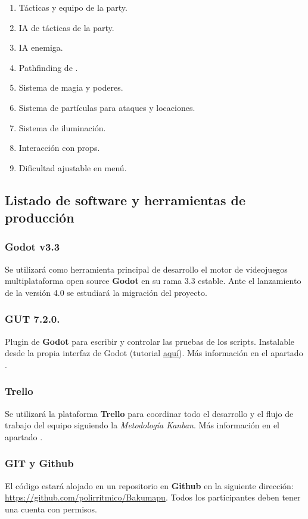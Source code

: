 \begin{enumerate}
\begin{enumerate}[noitemsep]
	\end{enumerate}
	\item Tácticas y equipo de la party.
	\item IA de tácticas de la party.
	\item IA enemiga.
	\item Pathfinding de .
	\item Sistema de magia y poderes.
	\item Sistema de partículas para ataques y locaciones.
	\item Sistema de iluminación.
	\item Interacción con props.
	\item Dificultad ajustable en menú.
\end{enumerate}

\subsection{Listado de software y herramientas de producción}\label{intro:software-y-herramientas}

\subsubsection{Godot v3.3}
Se utilizará como herramienta principal de desarrollo el motor de videojuegos multiplataforma open source \textbf{Godot} en su rama 3.3 estable. Ante el lanzamiento de la versión 4.0 se estudiará la migración del proyecto.

\subsubsection*{\small GUT 7.2.0.}
Plugin de \textbf{Godot} para escribir y controlar las pruebas de los scripts. Instalable desde la propia interfaz de Godot (tutorial \href{https://www.youtube.com/watch?v=5DrhMiuLRl0}{aquí}). Más información en el apartado .

\subsubsection{Trello}
Se utilizará la plataforma \textbf{Trello} para coordinar todo el desarrollo y el flujo de trabajo del equipo siguiendo la \emph{Metodología Kanban}. Más información en el apartado .

\subsubsection{GIT y Github}
El código estará alojado en un repositorio  en \textbf{Github} en la siguiente dirección: \url{https://github.com/polirritmico/Bakumapu}. Todos los participantes deben tener una cuenta con permisos.

